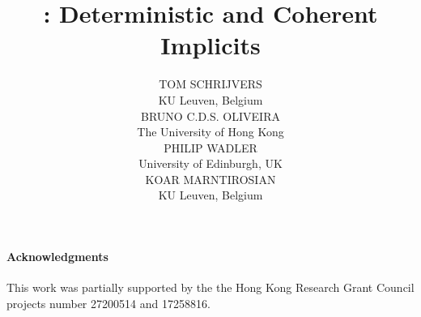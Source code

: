 \documentclass{jfp1}
\title[Cochis: Deterministic and Coherent Implicits]{\name: Deterministic and Coherent Implicits}
\author[T. Schrijvers, B. Oliveira, P. Wadler and K. Marntirosian]
       {TOM SCHRIJVERS \\
        KU Leuven, Belgium \\
        BRUNO C.D.S. OLIVEIRA \\
        The University of Hong Kong \\
        PHILIP WADLER \\ 
        University of Edinburgh, UK \\
        KOAR MARNTIROSIAN \\
        KU Leuven, Belgium
}
\begin{document}
\begingroup
\linenumbers

\maketitle

\begin{abstract}

\end{abstract}












%






\paragraph{Acknowledgments}
This work was
partially supported by the the Hong Kong Research Grant Council
projects number 27200514 and 17258816.

\newpage


\newpage
\appendix






\endgroup
\end{document}
